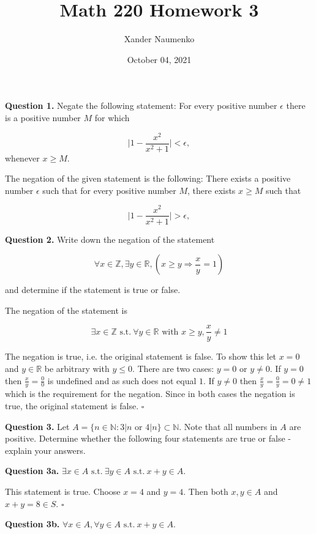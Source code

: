 \documentclass[letterpaper, reqno,11pt]{article}
\newcommand{\RR}{\mathbb{R}}
\newcommand{\ZZ}{\mathbb{Z}}
\newcommand{\NN}{\mathbb{N}}
\newcommand{\st}{\text{ s.t.}\ }
\begin{document}
\title{Math 220 Homework 3}
\date{October 04, 2021}
\author{Xander Naumenko}
\maketitle

{\noindent\bf Question 1.} Negate the following statement: For every positive number $\epsilon$ there is a positive number $M$ for which 

$$
    \bigg|1-\frac{x^2}{x^2+1}\bigg|<\epsilon,
$$
whenever $x\geq M$. 

\medskip

The negation of the given statement is the following: There exists a positive number $\epsilon$ such that for every positive number $M$, there exists $x\geq M$ such that

$$
    \bigg|1-\frac{x^2}{x^2+1}\bigg|>\epsilon,
$$

{\noindent\bf Question 2.} Write down the negation of the statement

$$
    \forall x\in\ZZ, \exists y\in\RR, (x\geq y\Rightarrow\frac xy=1)
$$

and determine if the statement is true or false. 

\medskip

The negation of the statement is 

$$
    \exists x\in\ZZ \st \forall y\in\RR \text{ with } x\geq y, \frac xy\neq 1
$$

The negation is true, i.e. the original statement is false. To show this let $x=0$ and $y\in\RR$ be arbitrary with $y\leq 0$. There are two cases: $y=0$ or $y\neq0$. If $y=0$ then $\frac xy=\frac00$ is undefined and as such does not equal $1$. If $y\neq 0$ then $\frac xy=\frac0y=0\neq1$ which is the requirement for the negation. Since in both cases the negation is true, the original statement is false. $\square$

{\noindent\bf Question 3.} Let $A=\{n\in\NN:3|n\text{ or }4|n\}\subset \NN$. Note that all numbers in $A$ are positive. Determine whether the following four statements are true or false - explain your answers. 

{\noindent\bf Question 3a.} $\exists x\in A\st\exists y\in A\st x+y\in A$. 

\medskip

This statement is true. Choose $x=4$ and $y=4$. Then both $x, y\in A$ and $x+y=8\in S$. $\square$

{\noindent\bf Question 3b.} $\forall x\in A, \forall y\in A\st x+y\in A$. 
\end{document}
